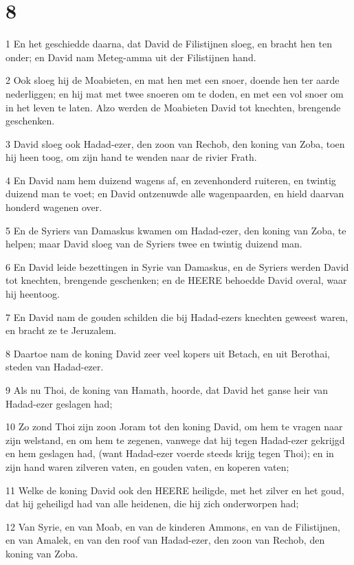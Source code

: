 \chapter{8}

\par 1 En het geschiedde daarna, dat David de Filistijnen sloeg, en bracht hen ten onder; en David nam Meteg-amma uit der Filistijnen hand.
\par 2 Ook sloeg hij de Moabieten, en mat hen met een snoer, doende hen ter aarde nederliggen; en hij mat met twee snoeren om te doden, en met een vol snoer om in het leven te laten. Alzo werden de Moabieten David tot knechten, brengende geschenken.
\par 3 David sloeg ook Hadad-ezer, den zoon van Rechob, den koning van Zoba, toen hij heen toog, om zijn hand te wenden naar de rivier Frath.
\par 4 En David nam hem duizend wagens af, en zevenhonderd ruiteren, en twintig duizend man te voet; en David ontzenuwde alle wagenpaarden, en hield daarvan honderd wagenen over.
\par 5 En de Syriers van Damaskus kwamen om Hadad-ezer, den koning van Zoba, te helpen; maar David sloeg van de Syriers twee en twintig duizend man.
\par 6 En David leide bezettingen in Syrie van Damaskus, en de Syriers werden David tot knechten, brengende geschenken; en de HEERE behoedde David overal, waar hij heentoog.
\par 7 En David nam de gouden schilden die bij Hadad-ezers knechten geweest waren, en bracht ze te Jeruzalem.
\par 8 Daartoe nam de koning David zeer veel kopers uit Betach, en uit Berothai, steden van Hadad-ezer.
\par 9 Als nu Thoi, de koning van Hamath, hoorde, dat David het ganse heir van Hadad-ezer geslagen had;
\par 10 Zo zond Thoi zijn zoon Joram tot den koning David, om hem te vragen naar zijn welstand, en om hem te zegenen, vanwege dat hij tegen Hadad-ezer gekrijgd en hem geslagen had, (want Hadad-ezer voerde steeds krijg tegen Thoi); en in zijn hand waren zilveren vaten, en gouden vaten, en koperen vaten;
\par 11 Welke de koning David ook den HEERE heiligde, met het zilver en het goud, dat hij geheiligd had van alle heidenen, die hij zich onderworpen had;
\par 12 Van Syrie, en van Moab, en van de kinderen Ammons, en van de Filistijnen, en van Amalek, en van den roof van Hadad-ezer, den zoon van Rechob, den koning van Zoba.
